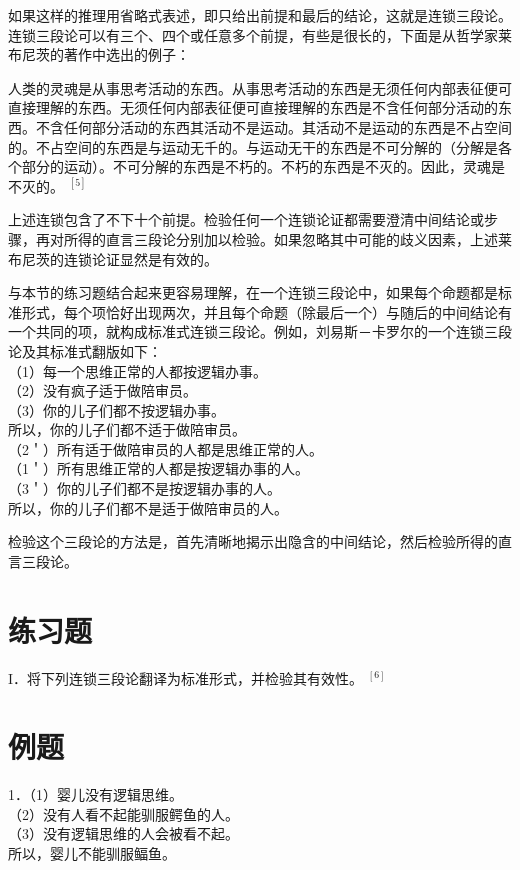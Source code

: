 如果这样的推理用省略式表述，即只给出前提和最后的结论，这就是连锁三段论。连锁三段论可以有三个、四个或任意多个前提，有些是很长的，下面是从哲学家莱布尼茨的著作中选出的例子：

\begin{displayquote}
人类的灵魂是从事思考活动的东西。从事思考活动的东西是无须任何内部表征便可直接理解的东西。无须任何内部表征便可直接理解的东西是不含任何部分活动的东西。不含任何部分活动的东西其活动不是运动。其活动不是运动的东西是不占空间的。不占空间的东西是与运动无千的。与运动无干的东西是不可分解的（分解是各个部分的运动）。不可分解的东西是不朽的。不朽的东西是不灭的。因此，灵魂是不灭的。 ${ }^{[5]}$
\end{displayquote}

上述连锁包含了不下十个前提。检验任何一个连锁论证都需要澄清中间结论或步骤，再对所得的直言三段论分别加以检验。如果忽略其中可能的歧义因素，上述莱布尼茨的连锁论证显然是有效的。

与本节的练习题结合起来更容易理解，在一个连锁三段论中，如果每个命题都是标准形式，每个项恰好出现两次，并且每个命题（除最后一个）与随后的中间结论有一个共同的项，就构成标准式连锁三段论。例如，刘易斯－卡罗尔的一个连锁三段论及其标准式翻版如下：\\
（1）每一个思维正常的人都按逻辑办事。\\
（2）没有疯子适于做陪审员。\\
（3）你的儿子们都不按逻辑办事。\\
所以，你的儿子们都不适于做陪审员。\\
（2＇）所有适于做陪审员的人都是思维正常的人。\\
（1＇）所有思维正常的人都是按逻辑办事的人。\\
（3＇）你的儿子们都不是按逻辑办事的人。\\
所以，你的儿子们都不是适于做陪审员的人。

检验这个三段论的方法是，首先清晰地揭示出隐含的中间结论，然后检验所得的直言三段论。

\section*{练习题}
I．将下列连锁三段论翻译为标准形式，并检验其有效性。 ${ }^{[6]}$

\section*{例题}
1．（1）婴儿没有逻辑思维。\\
（2）没有人看不起能驯服鳄鱼的人。\\
（3）没有逻辑思维的人会被看不起。\\
所以，婴儿不能驯服鲾鱼。

